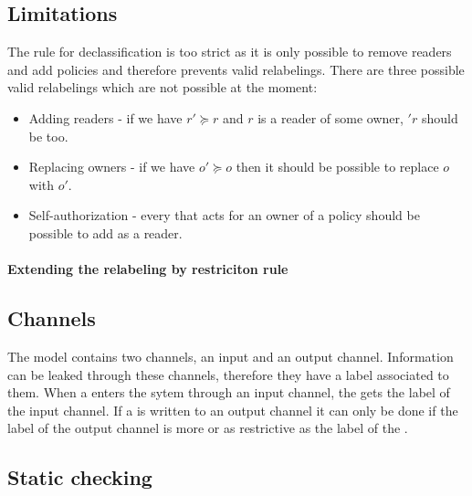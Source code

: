 \subsection{Limitations}
The rule for declassification is too strict as it is only possible to remove readers and add policies and therefore prevents valid relabelings.
There are three possible valid relabelings which are not possible at the moment:
\begin{itemize}
\item Adding readers - if we have $r' \succeq r$ and $r$ is a reader of some owner, $'r$ should be too.
\item Replacing owners - if we have $o' \succeq o$ then it should be possible to replace $o$ with $o'$.
\item Self-authorization - every \principal{} that acts for an owner of a policy should be possible to add as a reader.
\end{itemize}

\paragraph{Extending the relabeling by restriciton rule}

\subsection{Channels}
The model contains two channels, an input and an output channel.
Information can be leaked through these channels, therefore they have a label associated to them.
When a \xvalue{} enters the sytem through an input channel, the \xvalue{} gets the label of the input channel.
If a \xvalue{} is written to an output channel it can only be done if the label of the output channel is more or as restrictive as the label of the \xvalue{}.

\subsection{Static checking}
